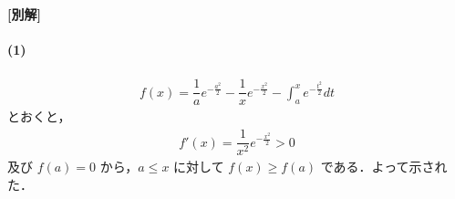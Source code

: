 \documentclass[../../main.tex]{subfiles}
\begin{document}
{\bf [別解]}

\paragraph{(1)}

\begin{align}
  f(x) = \dfrac{1}{a} e^{-\frac{a^2}{2}} - \dfrac{1}{x} e^{-\frac{x^2}{2}} - \int_a^x e^{-\frac{t^2}{2}} dt
\end{align}
とおくと，
\begin{align}
  f'(x) = \dfrac{1}{x^2} e^{-\frac{x^2}{2}} > 0
\end{align}
及び $f(a) = 0$ から，$a \le x$ に対して $f(x) \ge f(a)$ である．よって示された．
\end{document}

